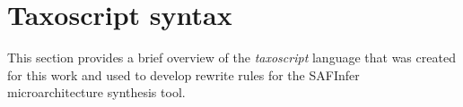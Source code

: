 \chapter{Taxoscript syntax}
\label{appendix:taxoscript}

This section provides a brief overview of the \textit{taxoscript} language that was created for this work and used to develop rewrite rules for the SAFInfer microarchitecture synthesis tool.

\clearpage
\newpage
